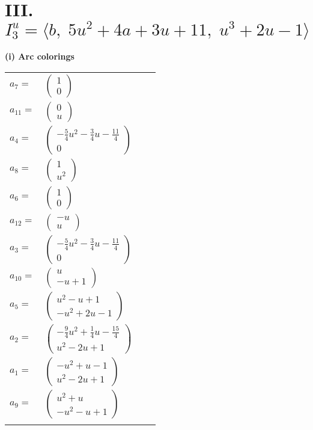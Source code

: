 \documentclass[1p]{elsarticle_modified}
\theoremstyle{definition}
\begin{document}
\centering \section*{III. $I^u_{3}= \langle b,\;5 u^2+4 a+3 u+11,\;u^3+2 u-1 \rangle$}
\flushleft \textbf{(i) Arc colorings}\\
\begin{tabular}{m{7pt} m{180pt} m{7pt} m{180pt} }
\flushright $a_{7}=$&$\begin{pmatrix}1\\0\end{pmatrix}$ \\
\flushright $a_{11}=$&$\begin{pmatrix}0\\u\end{pmatrix}$ \\
\flushright $a_{4}=$&$\begin{pmatrix}-\frac{5}{4} u^2-\frac{3}{4} u-\frac{11}{4}\\0\end{pmatrix}$ \\
\flushright $a_{8}=$&$\begin{pmatrix}1\\u^2\end{pmatrix}$ \\
\flushright $a_{6}=$&$\begin{pmatrix}1\\0\end{pmatrix}$ \\
\flushright $a_{12}=$&$\begin{pmatrix}- u\\u\end{pmatrix}$ \\
\flushright $a_{3}=$&$\begin{pmatrix}-\frac{5}{4} u^2-\frac{3}{4} u-\frac{11}{4}\\0\end{pmatrix}$ \\
\flushright $a_{10}=$&$\begin{pmatrix}u\\- u+1\end{pmatrix}$ \\
\flushright $a_{5}=$&$\begin{pmatrix}u^2- u+1\\- u^2+2 u-1\end{pmatrix}$ \\
\flushright $a_{2}=$&$\begin{pmatrix}-\frac{9}{4} u^2+\frac{1}{4} u-\frac{15}{4}\\u^2-2 u+1\end{pmatrix}$ \\
\flushright $a_{1}=$&$\begin{pmatrix}- u^2+u-1\\u^2-2 u+1\end{pmatrix}$ \\
\flushright $a_{9}=$&$\begin{pmatrix}u^2+u\\- u^2- u+1\end{pmatrix}$\\&\end{tabular}
\end{document}
